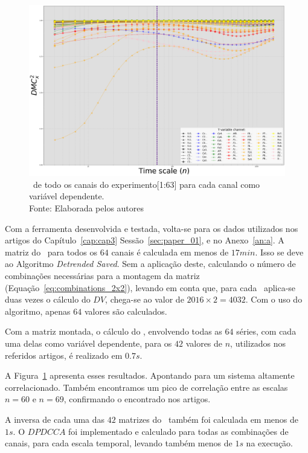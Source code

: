 \begin{figure}[!htb]
	\centering
	\includegraphics[width=.95\textwidth]{./Figures/art_03/dmc_all.png}
  \captionsetup{justification=centering}
  \caption{\dmc~de todo os canais do experimento[1:63] para cada canal como variável dependente.\\Fonte: Elaborada pelos autores}
	\label{fig:a03_dmc_total}
\end{figure}

Com a ferramenta desenvolvida e testada, volta-se para os dados utilizados nos artigos do Capítulo~\ref{cap:cap3} Sessão~\ref{sec:paper_01}, e no Anexo~\ref{an:a}. A matriz do \pdcca~para todos os $64$ canais é calculada em menos de $17min$. Isso se deve ao Algoritmo \emph{Detrended Saved}. Sem a aplicação deste, calculando o número de combinações necessárias para a montagem da matriz (Equação~\ref{eq:combinations_2x2}), levando em conta que, para cada \dcca~aplica-se duas vezes o cálculo do $DV$, chega-se ao valor de $2016 \times 2 = 4032$. Com o uso do algoritmo, apenas $64$ valores são calculados.

Com a matriz montada, o cálculo do \dmc, envolvendo todas as $64$ séries, com cada uma delas como variável dependente, para os $42$ valores de $n$, utilizados nos referidos artigos, é realizado em $0.7s$.

A Figura~\ref{fig:a03_dmc_total} apresenta esses resultados. Apontando para um sistema altamente correlacionado. Também encontramos um pico de correlação entre as escalas $n=60$ e $n=69$, confirmando o encontrado nos artigos.

A inversa de cada uma das $42$ matrizes do \pdcca~também foi calculada em menos de $1s$. O $DPDCCA$ foi implementado e calculado para todas as combinações de canais, para cada escala temporal, levando também menos de $1s$ na execução.

